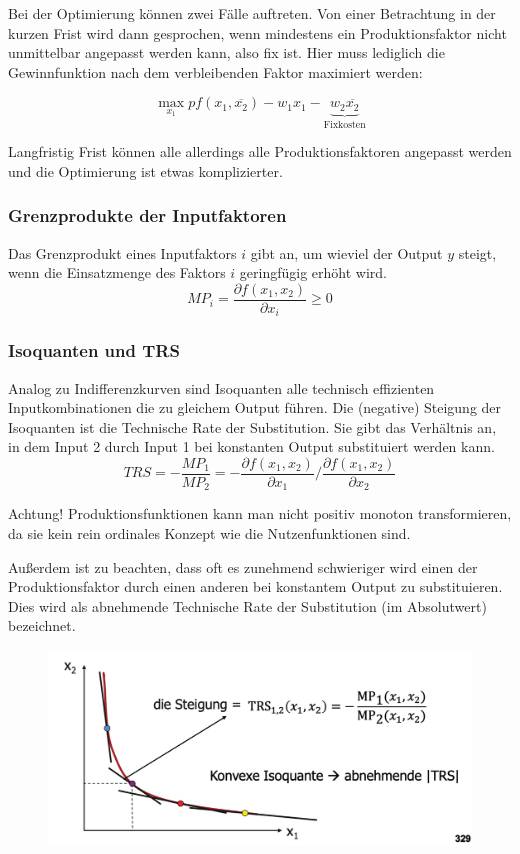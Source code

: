 Bei der Optimierung können zwei Fälle auftreten. Von einer Betrachtung in der kurzen Frist wird dann gesprochen, wenn mindestens ein Produktionsfaktor nicht unmittelbar angepasst werden kann, also fix ist. Hier muss lediglich die Gewinnfunktion nach dem verbleibenden Faktor maximiert werden:

$$ \max_{x_1} p f(x_1, \overline{x_2}) - w_1 x_1 - \underbrace{w_2 \overline{x_2}}_{\text{Fixkosten}} $$

Langfristig Frist können alle allerdings alle Produktionsfaktoren angepasst werden und die Optimierung ist etwas komplizierter.

\subsubsection*{Grenzprodukte der Inputfaktoren}

Das Grenzprodukt eines Inputfaktors $i$ gibt an, um wieviel der Output $y$ steigt, wenn die Einsatzmenge des Faktors $i$ geringfügig erhöht wird.
$$ MP_i = \frac{\partial f(x_1, x_2)}{\partial x_i} \geq 0 $$

\subsubsection*{Isoquanten und TRS}

Analog zu Indifferenzkurven sind Isoquanten alle technisch effizienten Inputkombinationen die zu gleichem Output führen. Die (negative) Steigung der Isoquanten ist die Technische Rate der Substitution. Sie gibt das Verhältnis an, in dem Input 2 durch Input 1 bei konstanten Output substituiert werden kann.
$$ TRS = - \frac{MP_1}{MP_2} = - \frac{\partial f(x_1, x_2)}{\partial x_1} \big/ \frac{\partial f(x_1, x_2)}{\partial x_2} $$

Achtung! Produktionsfunktionen kann man nicht positiv monoton transformieren, da sie kein rein ordinales Konzept wie die Nutzenfunktionen sind.

Außerdem ist zu beachten, dass oft es zunehmend schwieriger wird einen der Produktionsfaktor durch einen anderen bei konstantem Output zu substituieren. Dies wird als abnehmende Technische Rate der Substitution (im Absolutwert) bezeichnet.

\begin{figure}[!htbp] \centering
	\includegraphics[scale=0.4]{img/trs}
\end{figure}

